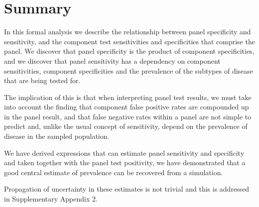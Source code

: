 \documentclass[a4paper, 12pt, twoside]{article}
\let\Oldsection\section
\renewcommand{\section}{\FloatBarrier\Oldsection}
\begin{document}
\section{Summary}

In this formal analysis we describe the relationship between panel specificity and sensitivity, and the component test sensitivities and specificities that comprise the panel. We discover that panel specificity is the product of component specificities, and we discover that panel sensitivity has a dependency on component sensitivities, component specificities and the prevalence of the subtypes of disease that are being tested for.

The implication of this is that when interpreting panel test results, we must take into account the finding that component false positive rates are compounded up in the panel result, and that false negative rates within a panel are not simple to predict and, unlike the usual concept of sensitivity, depend on the prevalence of disease in the sampled population.

We have derived expressions that can estimate panel sensitivity and specificity and taken together with the panel test positivity, we have demonstrated that a good central estimate of prevalence can be recovered from a simulation.

Propagation of uncertainty in these estimates is not trivial and this is addressed in Supplementary Appendix 2.
\end{document}
